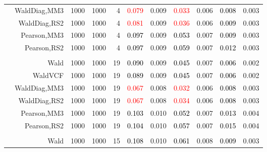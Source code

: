 \documentclass[
]{article}
\begin{document}
\begin{table}[H]
{\begin{tabular}[t]{lrrrrrrrlrr}
\hspace{1em} & WaldDiag,MM3 & 1000 & 1000 & 4 & \textcolor{red}{0.079} & 0.009 & \textcolor{red}{0.033} & 0.006 & \textcolor{black}{0.008} & 0.003\\

\hspace{1em} & WaldDiag,RS2 & 1000 & 1000 & 4 & \textcolor{red}{0.081} & 0.009 & \textcolor{red}{0.036} & 0.006 & \textcolor{black}{0.009} & 0.003\\

\hspace{1em} & Pearson,MM3 & 1000 & 1000 & 4 & \textcolor{black}{0.097} & 0.009 & \textcolor{black}{0.053} & 0.007 & \textcolor{black}{0.009} & 0.003\\

\hspace{1em} & Pearson,RS2 & 1000 & 1000 & 4 & \textcolor{black}{0.097} & 0.009 & \textcolor{black}{0.059} & 0.007 & \textcolor{black}{0.012} & 0.003\\
\cmidrule{1-11}
\addlinespace[0.3em]
\multicolumn{11}{l}{\textbf{1F 15V}}\\
\hspace{1em} & Wald & 1000 & 1000 & 19 & \textcolor{black}{0.090} & 0.009 & \textcolor{black}{0.045} & 0.007 & \textcolor{black}{0.006} & 0.002\\

\hspace{1em} & WaldVCF & 1000 & 1000 & 19 & \textcolor{black}{0.089} & 0.009 & \textcolor{black}{0.045} & 0.007 & \textcolor{black}{0.006} & 0.002\\

\hspace{1em} & WaldDiag,MM3 & 1000 & 1000 & 19 & \textcolor{red}{0.067} & 0.008 & \textcolor{red}{0.032} & 0.006 & \textcolor{black}{0.008} & 0.003\\

\hspace{1em} & WaldDiag,RS2 & 1000 & 1000 & 19 & \textcolor{red}{0.067} & 0.008 & \textcolor{red}{0.034} & 0.006 & \textcolor{black}{0.008} & 0.003\\

\hspace{1em} & Pearson,MM3 & 1000 & 1000 & 19 & \textcolor{black}{0.103} & 0.010 & \textcolor{black}{0.052} & 0.007 & \textcolor{black}{0.013} & 0.004\\

\hspace{1em} & Pearson,RS2 & 1000 & 1000 & 19 & \textcolor{black}{0.104} & 0.010 & \textcolor{black}{0.057} & 0.007 & \textcolor{black}{0.015} & 0.004\\
\cmidrule{1-11}
\addlinespace[0.3em]
\multicolumn{11}{l}{\textbf{2F 10V}}\\
\hspace{1em} & Wald & 1000 & 1000 & 15 & \textcolor{black}{0.108} & 0.010 & \textcolor{black}{0.061} & 0.008 & \textcolor{black}{0.009} & 0.003\\


\end{tabular}}
\end{table}
\end{document}
